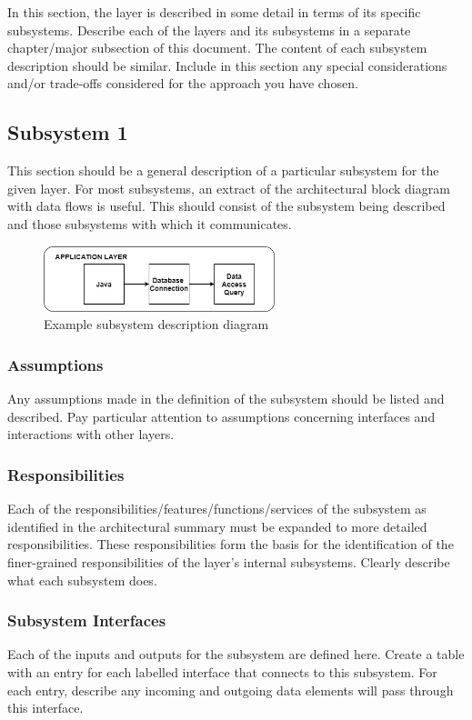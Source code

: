 In this section, the layer is described in some detail in terms of its specific subsystems. Describe each of the layers and its subsystems in a separate chapter/major subsection of this document. The content of each subsystem description should be similar. Include in this section any special considerations and/or trade-offs considered for the approach you have chosen.

\subsection{Subsystem 1}
This section should be a general description of a particular subsystem for the given layer. For most subsystems, an extract of the architectural block diagram with data flows is useful. This should consist of the subsystem being described and those subsystems with which it communicates.

\begin{figure}[h!]
	\centering
 	\includegraphics[width=0.60\textwidth]{images/App.jpg}
 \caption{Example subsystem description diagram}
\end{figure}

\subsubsection{Assumptions}
Any assumptions made in the definition of the subsystem should be listed and described. Pay particular attention to assumptions concerning interfaces and interactions with other layers.

\subsubsection{Responsibilities}
Each of the responsibilities/features/functions/services of the subsystem as identified in the architectural summary must be expanded to more detailed responsibilities. These responsibilities form the basis for the identification of the finer-grained responsibilities of the layer's internal subsystems. Clearly describe what each subsystem does.

\subsubsection{Subsystem Interfaces}
Each of the inputs and outputs for the subsystem are defined here. Create a table with an entry for each labelled interface that connects to this subsystem. For each entry, describe any incoming and outgoing data elements will pass through this interface.

